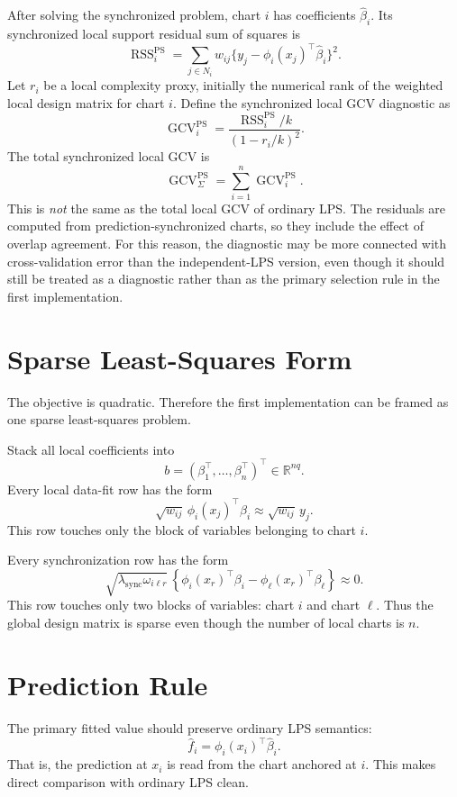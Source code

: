 \documentclass[11pt]{article}
\newcommand{\R}{\mathbb{R}}
\begin{document}
After solving the synchronized problem, chart \(i\) has coefficients
\(\widehat\beta_i\).  Its synchronized local support residual sum of squares is
\[
  \operatorname{RSS}^{\mathrm{PS}}_i
  =
  \sum_{j\in N_i}
  w_{ij}
  \{y_j-\phi_i(x_j)^\top\widehat\beta_i\}^2.
\]
Let \(r_i\) be a local complexity proxy, initially the numerical rank of the
weighted local design matrix for chart \(i\).  Define the synchronized local
GCV diagnostic as
\[
  \operatorname{GCV}^{\mathrm{PS}}_i
  =
  \frac{\operatorname{RSS}^{\mathrm{PS}}_i/k}
  {(1-r_i/k)^2}.
\]
The total synchronized local GCV is
\[
  \operatorname{GCV}^{\mathrm{PS}}_{\Sigma}
  =
  \sum_{i=1}^{n}
  \operatorname{GCV}^{\mathrm{PS}}_i.
\]
This is \emph{not} the same as the total local GCV of ordinary LPS.  The
residuals are computed from prediction-synchronized charts, so they include the
effect of overlap agreement.  For this reason, the diagnostic may be more
connected with cross-validation error than the independent-LPS version, even
though it should still be treated as a diagnostic rather than as the primary
selection rule in the first implementation.

\section{Sparse Least-Squares Form}

The objective is quadratic.  Therefore the first implementation can be framed
as one sparse least-squares problem.

Stack all local coefficients into
\[
  b =
  (\beta_1^\top,\ldots,\beta_n^\top)^\top \in \R^{nq}.
\]
Every local data-fit row has the form
\[
  \sqrt{w_{ij}}\,
  \phi_i(x_j)^\top\beta_i
  \approx
  \sqrt{w_{ij}}\,y_j.
\]
This row touches only the block of variables belonging to chart \(i\).

Every synchronization row has the form
\[
  \sqrt{\lambda_{\mathrm{sync}}\omega_{i\ell r}}\,
  \left\{
    \phi_i(x_r)^\top\beta_i
    -
    \phi_\ell(x_r)^\top\beta_\ell
  \right\}
  \approx 0.
\]
This row touches only two blocks of variables: chart \(i\) and chart \(\ell\).
Thus the global design matrix is sparse even though the number of local charts
is \(n\).

\section{Prediction Rule}

The primary fitted value should preserve ordinary LPS semantics:
\[
  \widehat f_i
  =
  \phi_i(x_i)^\top\widehat\beta_i.
\]
That is, the prediction at \(x_i\) is read from the chart anchored at \(i\).
This makes direct comparison with ordinary LPS clean.
\end{document}
